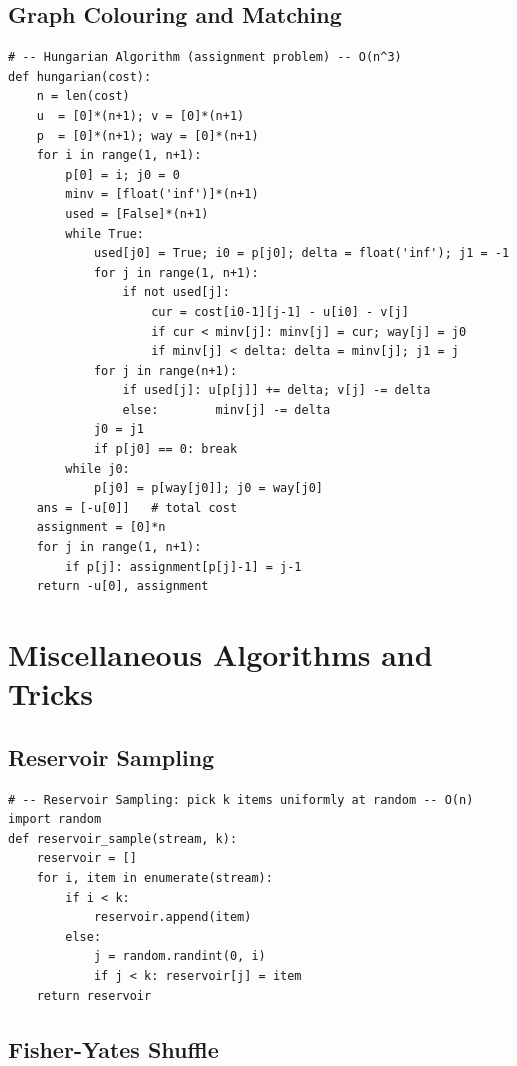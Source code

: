 \documentclass[11pt,a4paper]{report}
\begin{document}
\section{Graph Colouring and Matching}

\begin{lstlisting}
# -- Hungarian Algorithm (assignment problem) -- O(n^3)
def hungarian(cost):
    n = len(cost)
    u  = [0]*(n+1); v = [0]*(n+1)
    p  = [0]*(n+1); way = [0]*(n+1)
    for i in range(1, n+1):
        p[0] = i; j0 = 0
        minv = [float('inf')]*(n+1)
        used = [False]*(n+1)
        while True:
            used[j0] = True; i0 = p[j0]; delta = float('inf'); j1 = -1
            for j in range(1, n+1):
                if not used[j]:
                    cur = cost[i0-1][j-1] - u[i0] - v[j]
                    if cur < minv[j]: minv[j] = cur; way[j] = j0
                    if minv[j] < delta: delta = minv[j]; j1 = j
            for j in range(n+1):
                if used[j]: u[p[j]] += delta; v[j] -= delta
                else:        minv[j] -= delta
            j0 = j1
            if p[j0] == 0: break
        while j0:
            p[j0] = p[way[j0]]; j0 = way[j0]
    ans = [-u[0]]   # total cost
    assignment = [0]*n
    for j in range(1, n+1):
        if p[j]: assignment[p[j]-1] = j-1
    return -u[0], assignment
\end{lstlisting}

\chapter{Miscellaneous Algorithms and Tricks}

\section{Reservoir Sampling}

\begin{lstlisting}
# -- Reservoir Sampling: pick k items uniformly at random -- O(n)
import random
def reservoir_sample(stream, k):
    reservoir = []
    for i, item in enumerate(stream):
        if i < k:
            reservoir.append(item)
        else:
            j = random.randint(0, i)
            if j < k: reservoir[j] = item
    return reservoir
\end{lstlisting}

\section{Fisher-Yates Shuffle}
\end{document}
